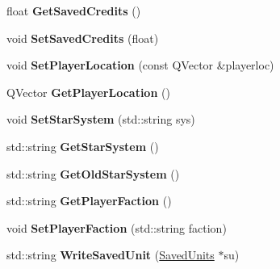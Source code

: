 \begin{DoxyCompactItemize}
\item 
float {\bfseries Get\+Saved\+Credits} ()\hypertarget{classSaveGame_a9f4c9202b9fa9cad23bc0a9915729309}{}\label{classSaveGame_a9f4c9202b9fa9cad23bc0a9915729309}

\item 
void {\bfseries Set\+Saved\+Credits} (float)\hypertarget{classSaveGame_a0e9205e237cf87b4ba057e34ea1ae519}{}\label{classSaveGame_a0e9205e237cf87b4ba057e34ea1ae519}

\item 
void {\bfseries Set\+Player\+Location} (const Q\+Vector \&playerloc)\hypertarget{classSaveGame_abf56439cb2fd413ba871669b7c501366}{}\label{classSaveGame_abf56439cb2fd413ba871669b7c501366}

\item 
Q\+Vector {\bfseries Get\+Player\+Location} ()\hypertarget{classSaveGame_a84b3f64f60cde2f3d6800d162dba1f8b}{}\label{classSaveGame_a84b3f64f60cde2f3d6800d162dba1f8b}

\item 
void {\bfseries Set\+Star\+System} (std\+::string sys)\hypertarget{classSaveGame_aa69f23b38c156dab39b5bb7f246e29a4}{}\label{classSaveGame_aa69f23b38c156dab39b5bb7f246e29a4}

\item 
std\+::string {\bfseries Get\+Star\+System} ()\hypertarget{classSaveGame_ac2401f66699523701431d9c80ac27cb4}{}\label{classSaveGame_ac2401f66699523701431d9c80ac27cb4}

\item 
std\+::string {\bfseries Get\+Old\+Star\+System} ()\hypertarget{classSaveGame_a9182c89522ba625af414dfa8d068bfa7}{}\label{classSaveGame_a9182c89522ba625af414dfa8d068bfa7}

\item 
std\+::string {\bfseries Get\+Player\+Faction} ()\hypertarget{classSaveGame_a0e3ee067d45ce12ab7086e9e941af08d}{}\label{classSaveGame_a0e3ee067d45ce12ab7086e9e941af08d}

\item 
void {\bfseries Set\+Player\+Faction} (std\+::string faction)\hypertarget{classSaveGame_a309b7f5e49982102c10b39270db94246}{}\label{classSaveGame_a309b7f5e49982102c10b39270db94246}

\item 
std\+::string {\bfseries Write\+Saved\+Unit} (\hyperlink{structSavedUnits}{Saved\+Units} $\ast$su)\hypertarget{classSaveGame_a27c72fa953147e00ded6329f7435e535}{}\label{classSaveGame_a27c72fa953147e00ded6329f7435e535}


\end{DoxyCompactItemize}
